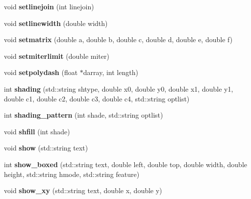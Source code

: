 \begin{DoxyCompactItemize}
\hypertarget{classPDFlib_a2940808d00b87a16074c03a074057a17}{}\label{classPDFlib_a2940808d00b87a16074c03a074057a17} 
void {\bfseries setlinejoin} (int linejoin)
\item 
\hypertarget{classPDFlib_a383b08525b4c2acb9700e4e6e964a80a}{}\label{classPDFlib_a383b08525b4c2acb9700e4e6e964a80a} 
void {\bfseries setlinewidth} (double width)
\item 
\hypertarget{classPDFlib_a3a8cc387192e3a2d0eceb04b004328f0}{}\label{classPDFlib_a3a8cc387192e3a2d0eceb04b004328f0} 
void {\bfseries setmatrix} (double a, double b, double c, double d, double e, double f)
\item 
\hypertarget{classPDFlib_a63946229c4ae1512d5533459192b9198}{}\label{classPDFlib_a63946229c4ae1512d5533459192b9198} 
void {\bfseries setmiterlimit} (double miter)
\item 
\hypertarget{classPDFlib_ac49a72864c82f10043e66ba6c1b5a0fb}{}\label{classPDFlib_ac49a72864c82f10043e66ba6c1b5a0fb} 
void {\bfseries setpolydash} (float $\ast$darray, int length)
\item 
\hypertarget{classPDFlib_afdd28cd764f222f1c102323a42657643}{}\label{classPDFlib_afdd28cd764f222f1c102323a42657643} 
int {\bfseries shading} (std\+::string shtype, double x0, double y0, double x1, double y1, double c1, double c2, double c3, double c4, std\+::string optlist)
\item 
\hypertarget{classPDFlib_af7936c5fdacd6363b41811f02e6bead9}{}\label{classPDFlib_af7936c5fdacd6363b41811f02e6bead9} 
int {\bfseries shading\+\_\+pattern} (int shade, std\+::string optlist)
\item 
\hypertarget{classPDFlib_acc1378fc57dce8d3fbdd218aaa95f8dc}{}\label{classPDFlib_acc1378fc57dce8d3fbdd218aaa95f8dc} 
void {\bfseries shfill} (int shade)
\item 
\hypertarget{classPDFlib_aaa7923ae29e03873a5ef1e80156b75c6}{}\label{classPDFlib_aaa7923ae29e03873a5ef1e80156b75c6} 
void {\bfseries show} (std\+::string text)
\item 
\hypertarget{classPDFlib_af282c4e9f187a86ac103ec9438722040}{}\label{classPDFlib_af282c4e9f187a86ac103ec9438722040} 
int {\bfseries show\+\_\+boxed} (std\+::string text, double left, double top, double width, double height, std\+::string hmode, std\+::string feature)
\item 
\hypertarget{classPDFlib_a28f2a9cae7188472df3a0d75e7bac6ac}{}\label{classPDFlib_a28f2a9cae7188472df3a0d75e7bac6ac} 
void {\bfseries show\+\_\+xy} (std\+::string text, double x, double y)
\item 

\end{DoxyCompactItemize}
